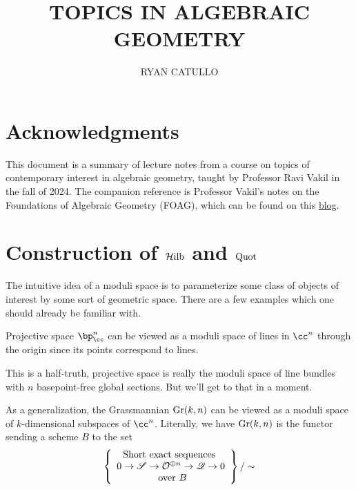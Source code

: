 \documentclass[12pt]{article}
\title{\large\bfseries{TOPICS IN ALGEBRAIC GEOMETRY}}
\author{\normalsize{RYAN CATULLO}}
\date{}
\begin{document}
\maketitle

\tableofcontents

\vspace{4em}
\pagestyle{fancy}

\section*{Acknowledgments}
This document is a summary of lecture notes from a course on topics of contemporary interest in algebraic geometry, taught by Professor Ravi Vakil in the fall of 2024. The companion reference is Professor Vakil's notes on the Foundations of Algebraic Geometry (FOAG), which can be found on this \href{https://math216.wordpress.com/}{blog}.

\section{Construction of $\operatorname{\mathcal{H} ilb}$ and $\operatorname{Quot}$}

The intuitive idea of a moduli space is to parameterize some class of objects of interest by some sort of geometric space. There are a few examples which one should already be familiar with.

\begin{example}
  Projective space $\bp_{\cc}^n$ can be viewed as a moduli space of lines in $\cc^n$ through the origin since its points correspond to lines.
\end{example}

This is a half-truth, projective space is really the moduli space of line bundles with $n$ basepoint-free global sections. But we'll get to that in a moment.

\begin{example}
  As a generalization, the Grassmannian $\operatorname{Gr}(k,n)$ can be viewed as a moduli space of $k$-dimensional subspaces of $\cc^n$. Literally, we have $\operatorname{Gr}(k,n)$ is the functor sending a scheme $B$ to the set
  \[\left\{\begin{array}{c}
  \text{Short exact sequences } \\
      0 \to \mathscr{S} \to \mathcal{O}^{\oplus n} \to \mathscr{Q} \to 0 \\
      \text{ over } B
  \end{array}\right\}/\sim\]
\end{example}
\end{document}
